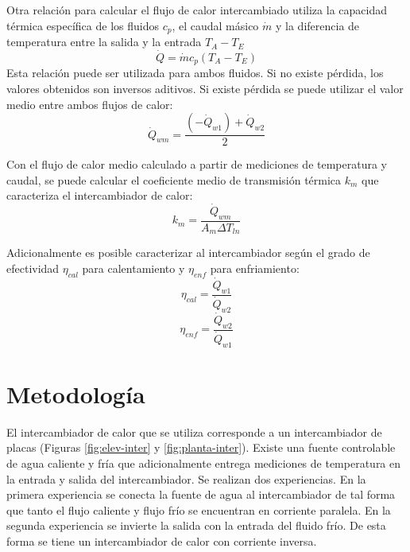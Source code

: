 \documentclass[letterpaper,11pt]{article} %
\begin{document}
Otra relación para calcular el flujo de calor intercambiado utiliza la capacidad térmica específica de los fluidos $c_p$, el caudal másico $\dot{m}$ y la diferencia de temperatura entre la salida y la entrada $T_{A}-T_{E}$
\begin{equation}
\dot{Q} = \dot{m}c_p (T_{A}-T_{E})
\end{equation}
Esta relación puede ser utilizada para ambos fluidos. Si no existe pérdida, los valores obtenidos son inversos aditivos. Si existe pérdida se puede utilizar el valor medio entre ambos flujos de calor:
\begin{equation}
\dot{Q}_{wm} = \frac{(-\dot{Q}_{w1}) + \dot{Q}_{w2}}{2}
\end{equation} 

Con el flujo de calor medio calculado a partir de mediciones de temperatura y caudal, se puede calcular el coeficiente medio de transmisión térmica $k_m$ que caracteriza el intercambiador de calor:
\begin{equation}
k_m = \frac{\dot{Q}_{wm}}{A_m \Delta T_{ln}}
\end{equation}

Adicionalmente es posible caracterizar al intercambiador según el grado de efectividad $\eta_{cal}$ para calentamiento y $\eta_{enf}$ para enfriamiento:
\begin{equation}
\eta_{cal} = \frac{\dot{Q}_{w1}}{\dot{Q}_{w2}}
\end{equation} 
\begin{equation}
\eta_{enf} = \frac{\dot{Q}_{w2}}{\dot{Q}_{w1}}
\end{equation}



\newpage

\section{Metodología}
El intercambiador de calor que se utiliza corresponde a un intercambiador de placas (Figuras \ref{fig:elev-inter} y \ref{fig:planta-inter}). Existe una fuente controlable de agua caliente y fría que adicionalmente entrega mediciones de temperatura en la entrada y salida del intercambiador. 
Se realizan dos experiencias. En la primera experiencia se conecta la fuente de agua al intercambiador de tal forma que tanto el flujo caliente y flujo frío se encuentran en corriente paralela. En la segunda experiencia se invierte la salida con la entrada del fluido frío. De esta forma se tiene un intercambiador de calor con corriente inversa.
\end{document}

